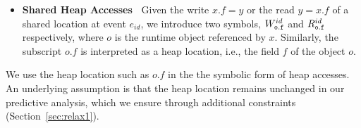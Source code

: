 \begin{itemize}
\begin{itemize}
\item  {\bf Shared Heap Accesses\ }    Given the write $x.f=y$ or the read $y=x.f$ of a shared location at event $e_{id}$, we introduce two symbols, $W^{id}_{\tt o.f }$ and $R^{id}_{\tt  o.f }$ respectively, where $o$ is the runtime object referenced by $x$. Similarly, the subscript $o.f$ is interpreted as a heap location, i.e., the field $f$ of the object $o$.
\end{itemize}
We use the heap location such as $o.f$ in the the symbolic form of heap accesses. An underlying assumption is that the heap location remains unchanged in our predictive analysis, which we ensure through additional constraints (Section~\ref{sec:relax1}).
\end{itemize}





%



